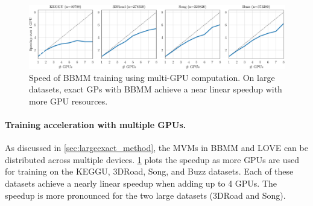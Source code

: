\begin{figure}[t!]
  \centering
  \includegraphics[width=\linewidth]{figures/gpu_speedup.pdf}
  \caption[Speed of BBMM training using multi-GPU computation.]{
    Speed of BBMM training using multi-GPU computation.
    On large datasets, exact GPs with BBMM achieve a near linear speedup with more GPU resources.
  }
  \label{fig:gpu_speedup}
\end{figure}

\paragraph{Training acceleration with multiple GPUs.}
As discussed in \cref{sec:largeexact_method}, the MVMs in BBMM and LOVE can be distributed across multiple devices.
\cref{fig:gpu_speedup} plots the speedup as more GPUs are used for training on the KEGGU, 3DRoad, Song, and Buzz datasets.
Each of these datasets achieve a nearly linear speedup when adding up to 4 GPUs.
The speedup is more pronounced for the two large datasets (3DRoad and Song).


